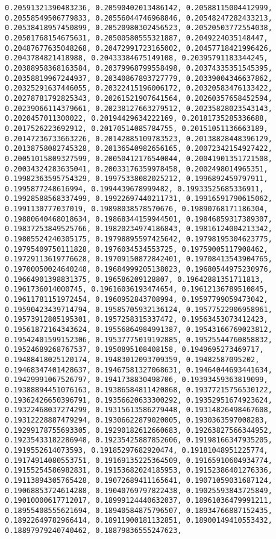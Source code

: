 \documentclass[11pt]{article}
\begin{document}
\begin{Verbatim}[commandchars=\\\{\}]
0.20591321390483236, 0.20590402013486142, 0.20588115004412999, 0.20558549506779833, 0.20556044746968846, 0.20548247282433213, 0.20538418957450899, 0.20520980302456523, 0.20520503772554038, 0.20501768154675631, 0.20500580555321887, 0.2049224035148447, 0.20487677635048268, 0.20472991723165002, 0.20457718421996426, 0.2043784821418988, 0.20433384675149108, 0.20395791183344245, 0.20388958368163584, 0.20379968799558498, 0.20374335351545395, 0.20358819967244937, 0.20340867893727779, 0.20339004346637862, 0.20325291637446055, 0.20322415196006172, 0.20320583476133422, 0.20278781792825343, 0.20261521907641564, 0.20260357658452594, 0.20239066114379661, 0.20238127663279512, 0.20235828023543143, 0.2020457011300022, 0.20194429634222169, 0.20181735285336688, 0.2017526223692912, 0.20170514085784755, 0.20151051136663189, 0.20147236733663226, 0.20142885109783523, 0.20138828448396129, 0.20138758082745328, 0.20136540982656165, 0.20072342154927422, 0.20051015809327599, 0.20050412176540044, 0.20041901351721508, 0.20034324283635041, 0.20033176359978458, 0.2002498014965351, 0.19982363595754329, 0.19975338082025212, 0.1996892459797911, 0.1995877248616994, 0.1994439678999482, 0.19933525685336911, 0.19928588568337499, 0.19922697440211731, 0.19916591790615062, 0.1991130777037019, 0.19898038578570676, 0.19890768171186304, 0.19880640468018634, 0.19868344159944501, 0.19846859317389307, 0.19837253849525766, 0.19820234974186843, 0.19816124004213342, 0.19805524240305175, 0.19798895597425642, 0.19798195304623775, 0.19795409750111828, 0.1976034534553725, 0.19759005117908462, 0.19729113619776628, 0.19709150872842401, 0.19708413543904765, 0.19700050024640248, 0.19684999205138023, 0.19680544975230976, 0.19664901398831375, 0.196586209128807, 0.19642881351711813, 0.1961736014000745, 0.19616036193474654, 0.19612136789510845, 0.19611781151972454, 0.1960952843708994, 0.19597799059473042, 0.19590423439714794, 0.19585705932136124, 0.19577522906958961, 0.19573912805195301, 0.1957258315337472, 0.19563453073412423, 0.19561872164343624, 0.19556864984991387, 0.19543166769023812, 0.19542401599152306, 0.19537775019192885, 0.19525544760858832, 0.19524689268767537, 0.1950895108408158, 0.1949695273469717, 0.19488418025120174, 0.19483012093709359, 0.19482587095202, 0.19468347401428637, 0.19467581327068631, 0.19464044693441634, 0.19429991067526797, 0.1941738830498706, 0.19393459363819099, 0.19388894451076163, 0.19386584811420868, 0.19377215756530122, 0.19362426650396791, 0.19356620633300292, 0.19352951674923624, 0.19322468037274299, 0.19315613586279448, 0.19314826498467608, 0.19312228887479294, 0.19306622879020005, 0.1930363597008283, 0.19299178755693305, 0.19290182612660683, 0.19263827566344952, 0.19235433182286948, 0.19235425887852606, 0.19198166347935205, 0.1919552614073593, 0.19185297682920474, 0.19181048951225774, 0.19174914080553751, 0.19169135225364509, 0.19165910604934774, 0.19155254586982831, 0.19153682024185953, 0.19152386401276336, 0.19113894305765428, 0.19072689411165641, 0.19071059031687124, 0.19068853724614288, 0.19040769797822438, 0.19025593843725849, 0.19010000617712017, 0.18999124440632037, 0.18961036479991211, 0.18955408555621694, 0.18940584875796507, 0.18934766887152435, 0.18922649782966414, 0.18911900181132851, 0.18900149410553432, 0.18897979240740462, 0.18879836555247623, 
\end{Verbatim}
\end{document}

